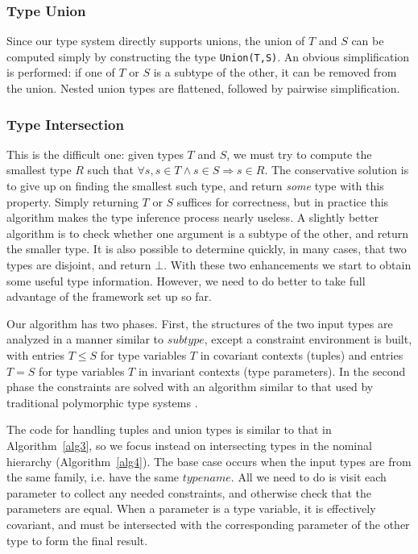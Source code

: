 \documentclass[9pt]{sigplanconf}
\begin{document}
\subsubsection{Type Union}

Since our type system directly supports unions, the union of $T$ and
$S$ can be computed simply by constructing the type {\tt Union(T,S)}.
An obvious simplification is performed: if one of $T$ or $S$ is a
subtype of the other, it can be removed from the union. Nested union
types are flattened, followed by pairwise simplification.

\subsubsection{Type Intersection}

This is the difficult one: given types $T$ and $S$, we must try to compute
the smallest type $R$ such that
$\forall s, s \in T \land s \in S \Rightarrow s \in R$.
The conservative solution is to give up on finding the smallest such type, and
return \emph{some} type with this property. Simply returning $T$ or $S$
suffices for correctness, but in practice this algorithm
makes the type inference process nearly useless. A slightly better
algorithm is to check whether one argument is a subtype of the other, and
return the smaller type. It is also possible to determine quickly, in
many cases, that two types are disjoint, and return $\bot$. With these
two enhancements we start to obtain some useful type information. However,
we need to do better to take full advantage of the framework set up
so far.

Our algorithm has two phases. First, the structures of the two input types
are analyzed in a manner similar to $subtype$, except a constraint
environment is built, with entries $T\leq S$ for type variables $T$ in
covariant contexts (tuples) and entries $T=S$ for type variables $T$ in
invariant contexts (type parameters). In the second phase the constraints
are solved with an algorithm similar to that
used by traditional polymorphic type systems \cite{MLtypeinf}.

The code for handling tuples and union types is similar to that in
Algorithm~\ref{alg3}, so we focus instead on intersecting types in the
nominal hierarchy (Algorithm~\ref{alg4}). The base case occurs when
the input types are from the same family, i.e. have the same
$typename$. All we need to do is visit each parameter to collect any
needed constraints, and otherwise check that the parameters are equal.
When a parameter is a type variable, it is effectively covariant, and
must be intersected with the corresponding parameter of the other type
to form the final result.
\end{document}
